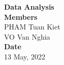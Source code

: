 \onehalfspacing


\vspace*{\fill}
\begin{center}
  \Large{\textbf{Data Analysis}}\\
  \vspace*{1\baselineskip}
  \Large{\textbf{Members}}\\
  PHAM Tuan Kiet\\
  VO Van Nghia\\
  \vfill
  \vspace*{\fill}
  \Large{\textbf{Date}}\\
  13 May, 2022
\end{center}

\newpage

\newpage
{}
\tableofcontents
{}

\newpage
{}
